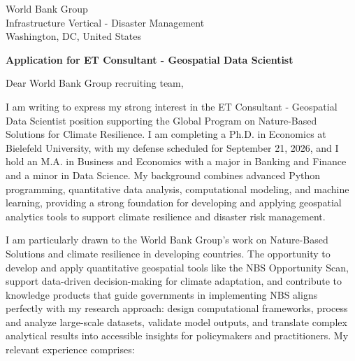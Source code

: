 \documentclass[11pt]{article}
\begin{document}
\vspace{0.1cm}

\vspace{0.1cm}

\noindent
World Bank Group \\
Infrastructure Vertical - Disaster Management \\
Washington, DC, United States

\vspace{0.12cm}

\noindent
\textbf{Application for ET Consultant - Geospatial Data Scientist}

\vspace{0.1cm}

\noindent Dear World Bank Group recruiting team,

I am writing to express my strong interest in the ET Consultant - Geospatial Data Scientist position supporting the Global Program on Nature-Based Solutions for Climate Resilience. 
I am completing a Ph.D. in Economics at Bielefeld University, with my defense scheduled for September 21, 2026, 
and I hold an M.A. in Business and Economics with a major in Banking and Finance and a minor in Data Science. 
My background combines advanced Python programming, quantitative data analysis, computational modeling, and machine learning, 
providing a strong foundation for developing and applying geospatial analytics tools to support climate resilience and disaster risk management.

I am particularly drawn to the World Bank Group's work on Nature-Based Solutions and climate resilience in developing countries. 
The opportunity to develop and apply quantitative geospatial tools like the NBS Opportunity Scan, support data-driven decision-making for climate adaptation, 
and contribute to knowledge products that guide governments in implementing NBS aligns perfectly with my research approach: 
design computational frameworks, process and analyze large-scale datasets, validate model outputs, 
and translate complex analytical results into accessible insights for policymakers and practitioners.
My relevant experience comprises:
\end{document}
